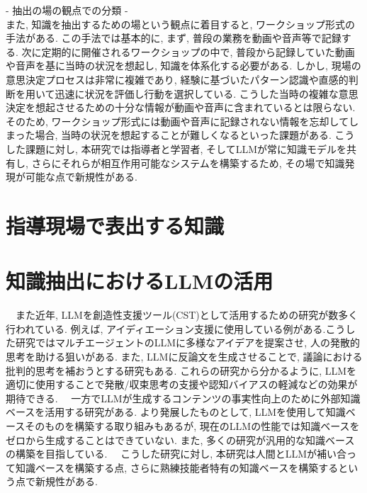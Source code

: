 - 抽出の場の観点での分類 -\\
また, 知識を抽出するための場という観点に着目すると, ワークショップ形式の手法がある\cite{Nishimura2017,Yoshida2022,Ijuin2022,Uchihira2022}. この手法では基本的に, まず, 普段の業務を動画や音声等で記録する. 次に定期的に開催されるワークショップの中で, 普段から記録していた動画や音声を基に当時の状況を想起し, 知識を体系化する必要がある. しかし, 現場の意思決定プロセスは非常に複雑であり, 経験に基づいたパターン認識や直感的判断を用いて迅速に状況を評価し行動を選択している\cite{Klein2008}. こうした当時の複雑な意思決定を想起させるための十分な情報が動画や音声に含まれているとは限らない. そのため, ワークショップ形式には動画や音声に記録されない情報を忘却してしまった場合, 当時の状況を想起することが難しくなるといった課題がある.
こうした課題に対し, 本研究では指導者と学習者, そしてLLMが常に知識モデルを共有し, さらにそれらが相互作用可能なシステムを構築するため, その場で知識発現が可能な点で新規性がある.

\section{指導現場で表出する知識}

\section{知識抽出におけるLLMの活用}
　また近年, LLMを創造性支援ツール(CST)として活用するための研究が数多く行われている. 例えば, アイディエーション支援に使用している例がある\cite{Tanaka2024}.こうした研究ではマルチエージェントのLLMに多様なアイデアを提案させ, 人の発散的思考を助ける狙いがある. また, LLMに反論文を生成させることで, 議論における批判的思考を補おうとする研究もある\cite{Ozaki2024}. これらの研究から分かるように, LLMを適切に使用することで発散/収束思考の支援や認知バイアスの軽減などの効果が期待できる. 
　一方でLLMが生成するコンテンツの事実性向上のために外部知識ベースを活用する研究がある\cite{Welz2024, Lewis2020}. より発展したものとして, LLMを使用して知識ベースそのものを構築する取り組みもある\cite{Ukai2023}が, 現在のLLMの性能では知識ベースをゼロから生成することはできていない. また, 多くの研究が汎用的な知識ベースの構築を目指している.  
　こうした研究に対し, 本研究は人間とLLMが補い合って知識ベースを構築する点, さらに熟練技能者特有の知識ベースを構築するという点で新規性がある.

\cite{Nishimura2008}